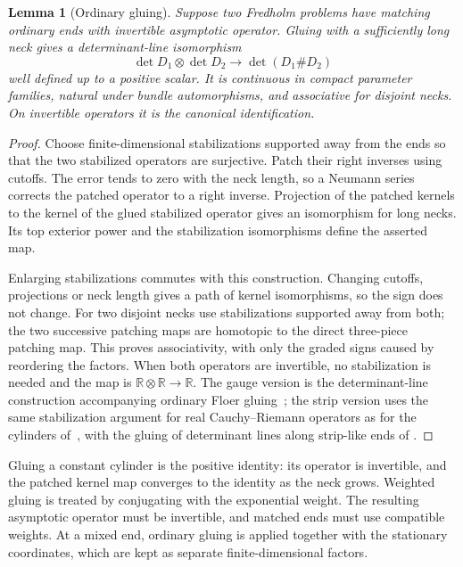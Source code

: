 \documentclass[11pt]{amsart}
\newtheorem{lemma}[theorem]{Lemma}
\theoremstyle{definition}
\theoremstyle{remark}
\theoremstyle{plain}
\numberwithin{equation}{section}
\newcommand{\RR}{\mathbb R}
\begin{document}
\begin{lemma}[Ordinary gluing]\label{lem:line-gluing}
Suppose two Fredholm problems have matching ordinary ends with
invertible asymptotic operator. Gluing with a sufficiently long
neck gives a determinant-line isomorphism
\[
 \det D_1\otimes\det D_2\longrightarrow\det(D_1\#D_2)
\]
well defined up to a positive scalar. It is continuous in
compact parameter families, natural under bundle
automorphisms, and associative for disjoint necks. On
invertible operators it is the canonical identification.
\end{lemma}
\begin{proof}
Choose finite-dimensional stabilizations supported away from
the ends so that the two stabilized operators are surjective.
Patch their right inverses using cutoffs. The error tends to
zero with the neck length, so a Neumann series corrects the
patched operator to a right inverse. Projection of the patched
kernels to the kernel of the glued stabilized operator gives
an isomorphism for long necks. Its top exterior power and the
stabilization isomorphisms define the asserted map.

Enlarging stabilizations commutes with this construction.
Changing cutoffs, projections or neck length gives a path of
kernel isomorphisms, so the sign does not change. For two
disjoint necks use stabilizations supported away from both;
the two successive patching maps are homotopic to the direct
three-piece patching map. This proves associativity, with
only the graded signs caused by reordering the factors. When
both operators are invertible, no stabilization is needed
and the map is $\RR\otimes\RR\to\RR$. The gauge version is
the determinant-line construction accompanying ordinary
Floer gluing~\cite[Proposition~5.11]{Donaldson-book}; the strip
version uses the same stabilization argument for real
Cauchy--Riemann operators as for the cylinders of~\cite{Floer-Hofer}, with the gluing of
determinant lines along strip-like ends of \cite[Proposition~2.4.3]{WW-orientations}.
\end{proof}

Gluing a constant cylinder is the positive identity: its
operator is invertible, and the patched kernel map converges
to the identity as the neck grows. Weighted gluing is treated
by conjugating with the exponential weight. The resulting
asymptotic operator must be invertible, and matched ends must
use compatible weights. At a mixed end, ordinary gluing is
applied together with the stationary coordinates, which are kept
as separate finite-dimensional factors.
\end{document}
